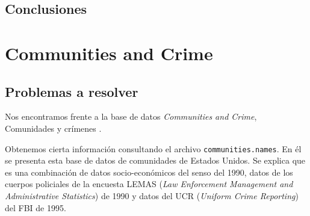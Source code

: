 \documentclass[a4paper, 20pt]{article}
\begin{document}
\subsection{Conclusiones}
\newpage


\section{Communities and Crime}

\subsection{Problemas a resolver}

Nos encontramos frente a la base de datos \textit{Communities and Crime}, Comunidades y crímenes \cite{com_uci}.

Obtenemos cierta información consultando el archivo \texttt{communities.names}. En él se presenta esta base de datos de comunidades de Estados Unidos. Se explica que es una combinación de datos socio-económicos del senso del 1990, datos de los cuerpos policiales de la encuesta LEMAS (\textit{Law Enforcement Management and Administrative Statistics}) de 1990 y datos del UCR (\textit{Uniform Crime Reporting}) del FBI de 1995.
\end{document}
